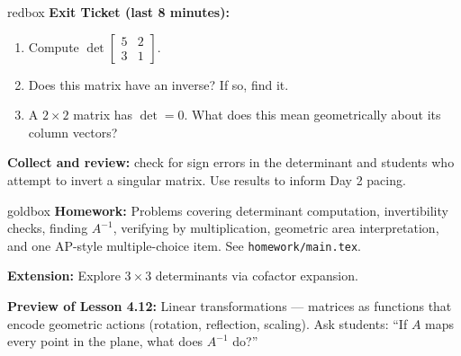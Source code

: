 \documentclass[10pt]{article}
\begin{document}
\begin{skillbox}{redbox}
    \textbf{Exit Ticket (last 8 minutes):}
    \begin{enumerate}[leftmargin=1.5em, itemsep=3pt]
        \item Compute $\det\begin{bmatrix}5&2\\3&1\end{bmatrix}$.
        \item Does this matrix have an inverse? If so, find it.
        \item A $2\times2$ matrix has $\det = 0$. What does this mean geometrically about
              its column vectors?
    \end{enumerate}
    \smallskip
    \textbf{Collect and review:} check for sign errors in the determinant and students who
    attempt to invert a singular matrix. Use results to inform Day 2 pacing.
\end{skillbox}

\begin{skillbox}{goldbox}
    \textbf{Homework:} Problems covering determinant computation, invertibility checks,
    finding $A^{-1}$, verifying by multiplication, geometric area interpretation, and one
    AP-style multiple-choice item. See \texttt{homework/main.tex}.

    \textbf{Extension:} Explore $3\times3$ determinants via cofactor expansion.

    \textbf{Preview of Lesson 4.12:} Linear transformations --- matrices as functions that
    encode geometric actions (rotation, reflection, scaling). Ask students: ``If $A$ maps
    every point in the plane, what does $A^{-1}$ do?''
\end{skillbox}
\end{document}
